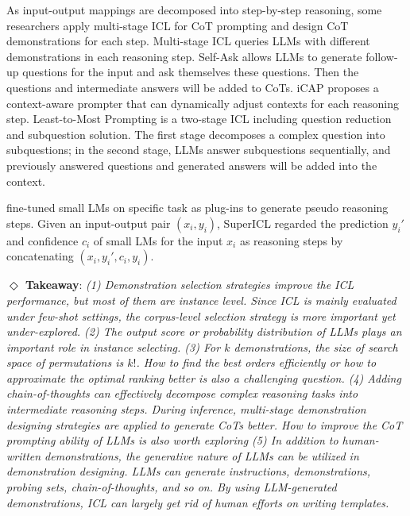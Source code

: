 As input-output mappings are decomposed into step-by-step reasoning, some researchers apply multi-stage ICL for CoT prompting and design CoT demonstrations for each step. Multi-stage ICL queries LLMs with different demonstrations in each reasoning step. Self-Ask \citep{selfask} allows LLMs to generate follow-up questions for the input and ask themselves these questions. Then the questions and intermediate answers will be added to CoTs. iCAP \citep{wang2022iteratively} proposes a context-aware prompter that can dynamically adjust contexts for each reasoning step. Least-to-Most Prompting \citep{least} is a two-stage ICL including question reduction and subquestion solution. The first stage decomposes a complex question into subquestions; in the second stage, LLMs answer subquestions sequentially, and previously answered questions and generated answers will be added into the context.

\citet{xu2023small} fine-tuned small LMs on specific task as plug-ins to generate pseudo reasoning steps. Given an input-output pair $(x_i,y_i)$, SuperICL regarded the prediction $y_i'$ and confidence $c_i$ of small LMs for the input $x_i$ as reasoning steps by concatenating $(x_i, y_i', c_i, y_i)$. 



\textbf{$\Diamond$ Takeaway}: \textit{ (1) Demonstration selection strategies improve the ICL performance, but most of them are instance level. Since ICL is mainly evaluated under few-shot settings, the corpus-level selection strategy is more important yet under-explored. (2) The output score or probability distribution of LLMs plays an important role in instance selecting. (3) For $k$ demonstrations, the size of search space of permutations is $k!$. How to find the best orders efficiently or how to approximate the optimal ranking better is also a challenging question. (4) Adding chain-of-thoughts can effectively decompose complex reasoning tasks into intermediate reasoning steps. During inference, multi-stage demonstration designing strategies are applied to generate CoTs better. How to improve the CoT prompting ability of LLMs is also worth exploring (5) In addition to human-written demonstrations, the generative nature of LLMs can be utilized in demonstration designing. LLMs can generate instructions, demonstrations, probing sets, chain-of-thoughts, and so on. By using LLM-generated demonstrations, ICL can largely get rid of human efforts on writing templates. }